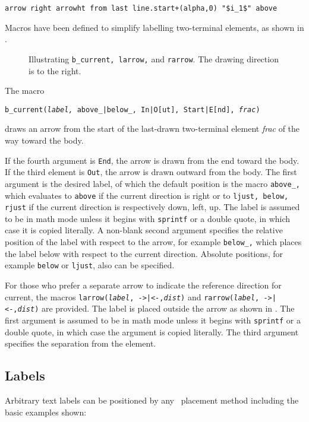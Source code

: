   \verb|arrow right arrowht from last line.start+(alpha,0) "$i_1$" above|

\enlargethispage{\baselineskip}%
Macros have been defined to simplify labelling two-terminal
elements, as shown in .
\begin{figure}[ht]
   
   \caption{Illustrating {\tt b\_current, larrow,} and {\tt rarrow}.
      The drawing direction is to the right.}
   \label{currents}
   \end{figure}
The macro

   {\tt b\_current({\sl label,} above\_|below\_, In|O[ut], Start|E[nd],
   {\sl frac})}

\noindent
draws an arrow from the start of the last-drawn two-terminal element
{\sl frac} of the way toward the body.

If the fourth argument is {\tt End}, the arrow is drawn from the end
toward the body.
If the third element is {\tt Out}, the arrow is drawn outward from the body.
The first argument is the desired label, of which the default position is
the macro {\tt above\_,} which evaluates to {\tt above} if the current
direction is right or to {\tt ljust, below, rjust} if the current
direction is respectively down, left, up.  The label is assumed to be
in math mode unless it begins with {\tt sprintf} or a double quote, in which
case it is copied literally.  A non-blank second argument specifies the
relative position of the label with respect to the arrow, for example
{\tt below\_,} which places the label below with respect to the current
direction.  Absolute positions, for example {\tt below} or {\tt ljust},
also can be specified.

For those who prefer a separate arrow to indicate the reference
direction for current, the macros {\tt larrow({\sl label}, ->|<-,{\sl dist})}
and {\tt rarrow({\sl label}, ->|<-,{\sl dist})} are provided.  The label is
placed outside the arrow as shown in .
The first argument is assumed to be in math mode unless
it begins with {\tt sprintf} or a double
quote, in which case the argument is copied literally.
The third argument specifies the separation from the element.

\subsection{Labels\label{Labels:}}
   Arbitrary text labels
   can be positioned by any \pic\ placement method including the
   basic examples shown:

